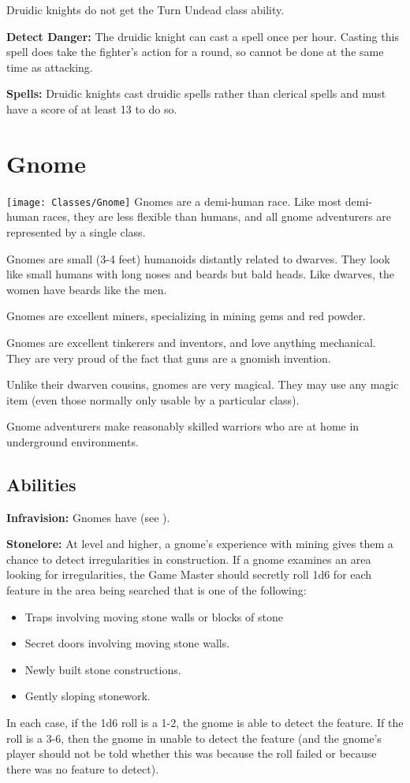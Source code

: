 \begin{multicols*}{2}
Druidic knights do not get the Turn Undead class ability.

\textbf{Detect Danger:} The druidic knight can cast a  spell once per hour. Casting this spell does take the fighter’s action for a round, so cannot be done at the same time as attacking.

\textbf{Spells:} Druidic knights cast druidic spells rather than clerical spells and must have a  score of at least 13 to do so.

\section{Gnome}\label{class:Gnome}
\texttt{[image: Classes/Gnome]}
Gnomes are a demi-human race. Like most demi-human races, they are less flexible than humans, and all gnome adventurers are represented by a single class.

Gnomes are small (3-4 feet) humanoids distantly related to dwarves. They look like small humans with long noses and beards but bald heads. Like dwarves, the women have beards like the men.

Gnomes are excellent miners, specializing in mining gems and red powder.

Gnomes are excellent tinkerers and inventors, and love anything mechanical. They are very proud of the fact that guns are a gnomish invention.

Unlike their dwarven cousins, gnomes are very magical. They may use any magic item (even those normally only usable by a particular class).

Gnome adventurers make reasonably skilled warriors who are at home in underground environments.

\subsection{Abilities}
\textbf{Infravision:} Gnomes have  (see ).

\textbf{Stonelore:} At  level and higher, a gnome’s experience with mining gives them a chance to detect irregularities in construction. If a gnome examines an area looking for irregularities, the Game Master should secretly roll 1d6 for each feature in the area being searched that is one of the following:

\begin{itemize}
	\item{Traps involving moving stone walls or blocks of stone}
	\item{Secret doors involving moving stone walls.}
	\item{Newly built stone constructions.}
	\item{Gently sloping stonework.}
\end{itemize}
In each case, if the 1d6 roll is a 1-2, the gnome is able to detect the feature. If the roll is a 3-6, then the gnome in unable to detect the feature (and the gnome’s player should not be told whether this was because the roll failed or because there was no feature to detect).


\end{multicols*}
